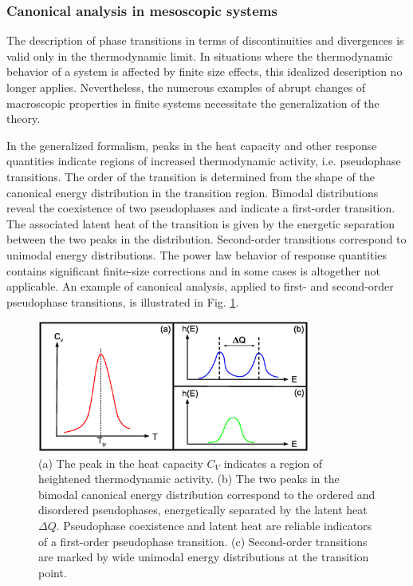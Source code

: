 \documentclass[12pt]{report}
\begin{document}
\subsubsection{Canonical analysis in mesoscopic systems} 
The description of phase transitions in terms of discontinuities and divergences is valid only in the thermodynamic limit. In situations where the thermodynamic behavior of a system is affected by finite size effects, this idealized description no longer applies. Nevertheless, the numerous examples of abrupt changes of macroscopic properties in finite systems necessitate the generalization of the theory. 

In the generalized formalism, peaks in the heat capacity and other response quantities indicate regions of increased thermodynamic activity, i.e. pseudophase transitions. The order of the transition is determined from the shape of the canonical energy distribution in the transition region. Bimodal distributions reveal the coexistence of two pseudophases and indicate a first-order transition\cite{Janke1998}. The associated latent heat of the transition is given by the energetic separation between the two peaks in the distribution. Second-order transitions correspond to unimodal energy distributions. The power law behavior of response quantities contains significant finite-size corrections and in some cases is altogether not applicable\cite{Landau2000}. An example of canonical analysis, applied to first- and second-order pseudophase transitions, is illustrated in Fig. \ref{fig:Fig_5}. 

\begin{figure}
\center
\includegraphics[width = 0.8\textwidth]{chapter2Figs/CanonicalAnalysisSample.eps}
\caption{\label{fig:Fig_5}%
(a) The peak in the heat capacity $C_{V}$ indicates a region of heightened thermodynamic activity. (b) The two peaks in the bimodal canonical energy distribution correspond to the ordered and disordered pseudophases, energetically separated by the latent heat $\Delta Q$. Pseudophase coexistence and latent heat are reliable indicators of a first-order pseudophase transition. (c) Second-order transitions are marked by wide unimodal energy distributions at the transition point.}
\end{figure}
\end{document}
